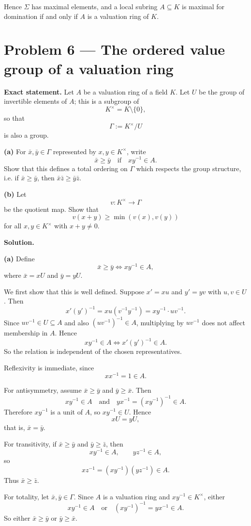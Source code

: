 \documentclass[12pt,a4paper]{article}
\theoremstyle{notespace}
\begin{document}
Hence \(\Sigma\) has maximal elements, and a local subring \(A\subseteq K\) is maximal for domination if and only if \(A\) is a valuation ring of \(K\).

\section{Problem 6 --- The ordered value group of a valuation ring}

\textbf{Exact statement.}
Let \(A\) be a valuation ring of a field \(K\). Let \(U\) be the group of invertible elements of \(A\); this is a subgroup of
\[
K^\times=K\setminus\{0\},
\]
so that
\[
\Gamma:=K^\times/U
\]
is also a group.

\textbf{(a)} For \(\bar x,\bar y\in \Gamma\) represented by \(x,y\in K^\times\), write
\[
\bar x\ge \bar y \quad\text{if}\quad xy^{-1}\in A.
\]
Show that this defines a total ordering on \(\Gamma\) which respects the group structure, i.e. if \(\bar x\ge \bar y\), then \(\bar x\bar z\ge \bar y\bar z\).

\textbf{(b)} Let
\[
v:K^\times\to \Gamma
\]
be the quotient map. Show that
\[
v(x+y)\ge \min(v(x),v(y))
\]
for all \(x,y\in K^\times\) with \(x+y\neq 0\).

\textbf{Solution.}

\textbf{(a)} Define
\[
\bar x\ge \bar y \iff xy^{-1}\in A,
\]
where \(\bar x=xU\) and \(\bar y=yU\).

We first show that this is well defined. Suppose \(x'=xu\) and \(y'=yv\) with \(u,v\in U\). Then
\[
x'(y')^{-1}=xu(v^{-1}y^{-1})=xy^{-1}\cdot uv^{-1}.
\]
Since \(uv^{-1}\in U\subseteq A\) and also \((uv^{-1})^{-1}\in A\), multiplying by \(uv^{-1}\) does not affect membership in \(A\). Hence
\[
xy^{-1}\in A \iff x'(y')^{-1}\in A.
\]
So the relation is independent of the chosen representatives.

Reflexivity is immediate, since
\[
xx^{-1}=1\in A.
\]

For antisymmetry, assume \(\bar x\ge \bar y\) and \(\bar y\ge \bar x\). Then
\[
xy^{-1}\in A
\quad\text{and}\quad
yx^{-1}=(xy^{-1})^{-1}\in A.
\]
Therefore \(xy^{-1}\) is a unit of \(A\), so \(xy^{-1}\in U\). Hence
\[
xU=yU,
\]
that is, \(\bar x=\bar y\).

For transitivity, if \(\bar x\ge \bar y\) and \(\bar y\ge \bar z\), then
\[
xy^{-1}\in A,\qquad yz^{-1}\in A,
\]
so
\[
xz^{-1}=(xy^{-1})(yz^{-1})\in A.
\]
Thus \(\bar x\ge \bar z\).

For totality, let \(\bar x,\bar y\in \Gamma\). Since \(A\) is a valuation ring and \(xy^{-1}\in K^\times\), either
\[
xy^{-1}\in A
\quad\text{or}\quad
(xy^{-1})^{-1}=yx^{-1}\in A.
\]
So either \(\bar x\ge \bar y\) or \(\bar y\ge \bar x\).
\end{document}
